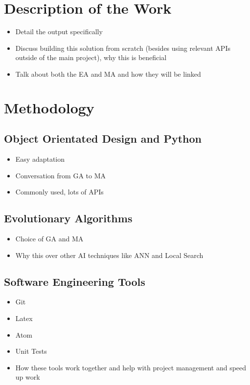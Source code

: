 \documentclass[a4paper]{article}
\begin{document}
\section{Description of the Work}
\begin{itemize}
    \item Detail the output specifically
    \item Discuss building this solution from scratch (besides using relevant APIs outside of the main project), why this is beneficial
    \item Talk about both the EA and MA and how they will be linked
\end{itemize}

\section{Methodology}
\subsection{Object Orientated Design and Python}
\begin{itemize}
    \item Easy adaptation
    \item Conversation from GA to MA
    \item Commonly used, lots of APIs
\end{itemize}
\subsection{Evolutionary Algorithms}
\begin{itemize}
    \item Choice of GA and MA
    \item Why this over other AI techniques like ANN and Local Search
\end{itemize}
\subsection{Software Engineering Tools}
\begin{itemize}
    \item Git
    \item Latex
    \item Atom
    \item Unit Tests
    \item How these tools work together and help with project management and speed up work
\end{itemize}
\end{document}
